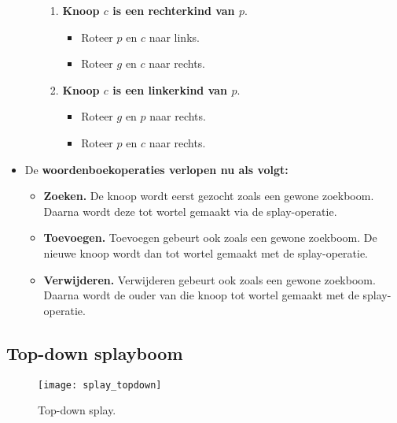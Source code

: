 \begin{itemize}
\begin{enumerate}
        \begin{enumerate}
            \item \textbf{Knoop $c$ is een rechterkind van $p$}.
            \begin{itemize}
                \item Roteer $p$ en $c$ naar links.
                \item Roteer $g$ en $c$ naar rechts.
            \end{itemize}
            \item \textbf{Knoop $c$ is een linkerkind van $p$}.
            \begin{itemize}
                \item Roteer $g$ en $p$ naar rechts.
                \item Roteer $p$ en $c$ naar rechts.
            \end{itemize}
        \end{enumerate}
    \end{enumerate}
    \item De \textbf{woordenboekoperaties verlopen nu als volgt:}
    \begin{itemize}
        \item \textbf{Zoeken.} De knoop wordt eerst gezocht zoals een gewone zoekboom. Daarna wordt deze tot wortel gemaakt via de splay-operatie. 
        \item \textbf{Toevoegen.} Toevoegen gebeurt ook zoals een gewone zoekboom. De nieuwe knoop wordt dan tot wortel gemaakt met de splay-operatie.
        \item \textbf{Verwijderen.} Verwijderen gebeurt ook zoals een gewone zoekboom. Daarna wordt de ouder van die knoop tot wortel gemaakt met de splay-operatie.
    \end{itemize}
\end{itemize}
\subsection{Top-down splayboom}
\begin{figure}[ht]
    \centering
    \texttt{[image: splay\_topdown]}
    \caption{Top-down splay.}
    \label{fig:splay_topdown}
\end{figure}

